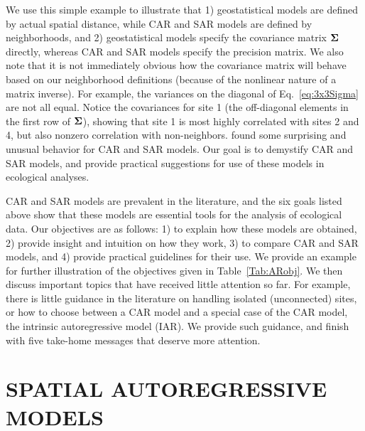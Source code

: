 \documentclass[11pt, titlepage]{article}\usepackage[]{graphicx}\usepackage[]{color}
\begin{document}
\begin{spacing}{1.9}
\begin{flushleft}
We use this simple example to illustrate that 1) geostatistical models are defined by actual spatial distance, while CAR and SAR models are defined by neighborhoods, and 2) geostatistical models specify the covariance matrix $\mbox{\boldmath $\Sigma$}$ directly, whereas CAR and SAR models specify the precision matrix.  We also note that it is not immediately obvious how the covariance matrix will behave based on our neighborhood definitions (because of the nonlinear nature of a matrix inverse).  For example, the variances on the diagonal of Eq.~\ref{eq:3x3Sigma} are not all equal. Notice the covariances for site 1 (the off-diagonal elements in the first row of $\mbox{\boldmath $\Sigma$}$), showing that site 1 is most highly correlated with sites 2 and 4, but also nonzero correlation with non-neighbors. \citet{Wall:clos:2004} found some surprising and unusual behavior for CAR and SAR models.  Our goal is to demystify CAR and SAR models, and provide practical suggestions for use of these models in ecological analyses. 

CAR and SAR models are prevalent in the literature, and the six goals listed above show that these models are essential tools for the analysis of ecological data.  Our objectives are as follows: 1) to explain how these models are obtained, 2) provide insight and intuition on how they work, 3) to compare CAR and SAR models, and 4) provide practical guidelines for their use. We provide an example for further illustration of the objectives given in Table~\ref{Tab:ARobj}. We then discuss important topics that have received little attention so far.  For example, there is little guidance in the literature on handling isolated (unconnected) sites, or how to choose between a CAR model and a special case of the CAR model, the intrinsic autoregressive model (IAR).  We provide such guidance, and finish with five take-home messages that deserve more attention.
 

\section*{SPATIAL AUTOREGRESSIVE MODELS}


\end{flushleft}
\end{spacing}
\end{document}
